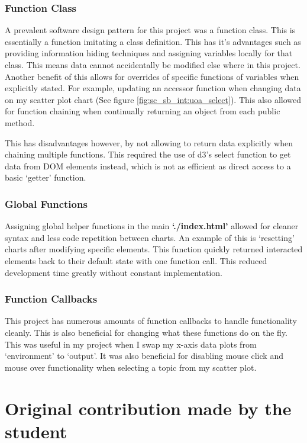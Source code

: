 \documentclass[a4paper, 11pt]{article}
\begin{document}
\subsubsection{Function Class}
A prevalent software design pattern for this project was a function class. This is essentially a function imitating a class definition. This has it's advantages such as providing information hiding techniques and assigning variables locally for that class. This means data cannot accidentally be modified else where in this project. Another benefit of this allows for overrides of specific functions of variables when explicitly stated. For example, updating an accessor function when changing data on my scatter plot chart (See figure \ref{fig:sc_sb_int:uoa_select}). This also allowed for function chaining when continually returning an object from each public method.

This has disadvantages however, by not allowing to return data explicitly when chaining multiple functions. This required the use of d3's select function to get data from DOM elements instead, which is not as efficient as direct access to a basic `getter' function.

\subsubsection{Global Functions}
Assigning global helper functions in the main \textbf{`./index.html'} allowed for cleaner syntax and less code repetition between charts. An example of this is `resetting' charts after modifying specific elements. This function quickly returned interacted elements back to their default state with one function call. This reduced development time greatly without constant implementation.

\subsubsection{Function Callbacks}
This project has numerous amounts of function callbacks to handle functionality cleanly. This is also beneficial for changing what these functions do on the fly. This was useful in my project when I swap my x-axis data plots from `environment' to `output'. It was also beneficial for disabling mouse click and mouse over functionality when selecting a topic from my scatter plot.




\section{Original contribution made by the student}
\end{document}
